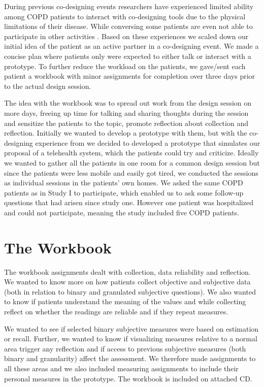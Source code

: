 During previous co-designing events researchers have  experienced limited ability among COPD patients to interact with co-designing tools due to the physical limitations of their disease. While conversing some patients are even not able to participate in other activities \citep{genTech}. Based on these experiences we scaled down our initial idea of the patient as an active partner in a co-designing event. We made a concise plan where patients only were expected to either talk or interact with a prototype. To further reduce the workload on the patients, we gave/sent each patient a workbook with minor assignments for completion over three days prior to the actual design session. 

The idea with the workbook was to spread out work from the design session on more days, freeing up time for talking and sharing thoughts during the session and sensitize the patients to the topic, promote reflection about collection and reflection. Initially we wanted to develop a prototype with them, but with the co-designing experience from \citep{genTech} we decided to developed a prototype that simulates our proposal of a telehealth system, which the patients could try and criticize. Ideally we wanted to gather all the patients in one room for a common design session but since the patients were less mobile and easily got tired, we conducted the sessions as individual sessions in the patients' own homes. We asked the same COPD patients as in Study I to participate, which enabled us to ask some follow-up questions that had arisen since study one. However one patient was hospitalized and could not participate,  meaning the study included five COPD patients.

\section{The Workbook}

The workbook assignments dealt with collection, data reliability and reflection. We wanted to know more on how patients collect objective and subjective data (both in relation to binary and granulated subjective questions). We also wanted to know if patients understand the meaning of the values and while collecting reflect on whether the readings are reliable and if they repeat measures. 

We wanted to see if selected binary subjective measures were based on estimation or recall. Further, we wanted to know if visualizing measures relative to a normal area trigger any reflection and if access to previous subjective measures (both  binary and granularity) affect the assessment. We therefore made assignments to all these areas and we also included measuring assignments to include their personal measures in the prototype. The workbook is included on attached CD.


